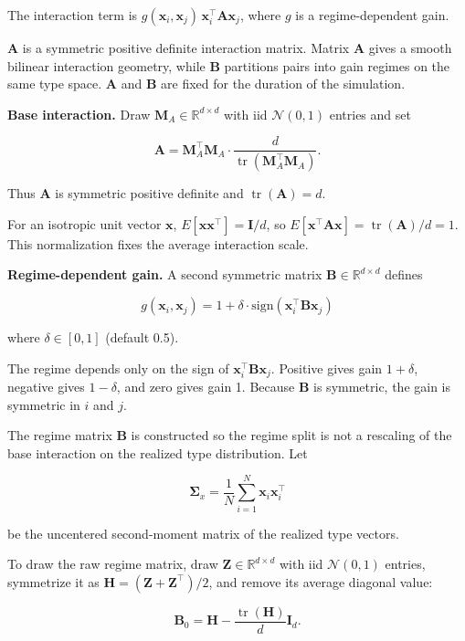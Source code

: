 \documentclass[11pt]{article}
\begin{document}
The interaction term is \(g(\mathbf{x}_i,\mathbf{x}_j)\,\mathbf{x}_i^\top\mathbf{A}\mathbf{x}_j\), where \(g\) is a regime-dependent gain.

\(\mathbf{A}\) is a symmetric positive definite interaction matrix. Matrix \(\mathbf{A}\) gives a smooth bilinear interaction geometry, while \(\mathbf{B}\) partitions pairs into gain regimes on the same type space. \(\mathbf{A}\) and \(\mathbf{B}\) are fixed for the duration of the simulation.

\textbf{Base interaction.} Draw \(\mathbf{M}_A\in\mathbb{R}^{d\times d}\) with iid \(\mathcal{N}(0,1)\) entries and set

\[
\mathbf{A}=\mathbf{M}_A^\top\mathbf{M}_A\cdot\frac{d}{\operatorname{tr}(\mathbf{M}_A^\top\mathbf{M}_A)}.
\]

Thus \(\mathbf{A}\) is symmetric positive definite and \(\operatorname{tr}(\mathbf{A})=d\).

For an isotropic unit vector \(\mathbf{x}\), \(E[\mathbf{x}\mathbf{x}^\top]=\mathbf{I}/d\), so \(E[\mathbf{x}^\top\mathbf{A}\mathbf{x}]=\operatorname{tr}(\mathbf{A})/d=1\). This normalization fixes the average interaction scale.

\textbf{Regime-dependent gain.} A second symmetric matrix \(\mathbf{B}\in\mathbb{R}^{d\times d}\) defines

\[g(\mathbf{x}_i, \mathbf{x}_j) = 1 + \delta \cdot \text{sign}(\mathbf{x}_i^\top \mathbf{B} \mathbf{x}_j)\]

where \(\delta\in[0,1]\) (default 0.5).

The regime depends only on the sign of \(\mathbf{x}_i^\top\mathbf{B}\mathbf{x}_j\). Positive gives gain \(1+\delta\), negative gives \(1-\delta\), and zero gives gain 1. Because \(\mathbf{B}\) is symmetric, the gain is symmetric in \(i\) and \(j\).

The regime matrix \(\mathbf{B}\) is constructed so the regime split is not a rescaling of the base interaction on the realized type distribution. Let

\[\boldsymbol{\Sigma}_x = \frac{1}{N} \sum_{i=1}^N \mathbf{x}_i \mathbf{x}_i^\top\]

be the uncentered second-moment matrix of the realized type vectors.

To draw the raw regime matrix, draw \(\mathbf{Z}\in\mathbb{R}^{d\times d}\) with iid \(\mathcal{N}(0,1)\) entries, symmetrize it as \(\mathbf{H}=(\mathbf{Z}+\mathbf{Z}^\top)/2\), and remove its average diagonal value:

\[
\mathbf{B}_0 = \mathbf{H} - \frac{\operatorname{tr}(\mathbf{H})}{d}\mathbf{I}_d.
\]
\end{document}
